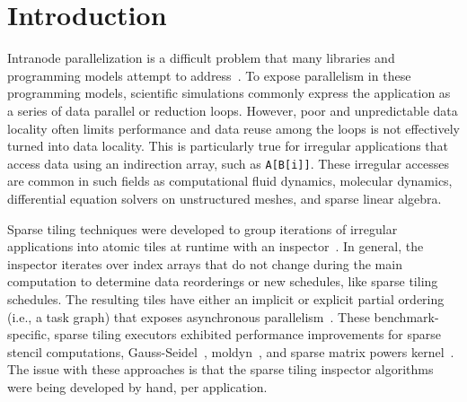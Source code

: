 \section{Introduction}
\label{sec:intro}
Intranode parallelization is a difficult problem that many libraries and programming models attempt 
to address~\cite{ASCRExascaleLethin}.
To expose parallelism in these programming models, 
scientific simulations commonly express the application as a series of 
data parallel or reduction loops. 
However, poor and unpredictable data locality often limits performance and 
data reuse among the loops is not effectively turned into data locality.
This is particularly true for irregular applications that access data 
using an indirection array, such as \texttt{A[B[i]]}. 
These irregular accesses are common in such fields as computational 
fluid dynamics, molecular dynamics, differential equation solvers on unstructured meshes, and sparse linear algebra.

Sparse tiling techniques were developed to group iterations of irregular applications
into atomic tiles at runtime with an 
inspector~\cite{dimeEtna00,StroutIJHPCA,StroutPLDI03,commAvoidingSparse2009}.
In general, the inspector iterates over index arrays that do not change during
the main computation to determine data reorderings or new schedules, like
sparse tiling schedules.
The resulting tiles have either an implicit or explicit partial ordering (i.e., a task graph)
that exposes asynchronous parallelism~\cite{Adams99c,dimeEtna00,StroutLCPC2002}.
These benchmark-specific, sparse tiling executors
exhibited performance improvements for sparse stencil computations, 
Gauss-Seidel~\cite{Adams99c,StroutIJHPCA}, moldyn~\cite{StroutPLDI03},
and sparse matrix powers kernel~\cite{commAvoidingSparse2009}.
The issue with these approaches is that the sparse tiling inspector algorithms
were being developed by hand, per application.


